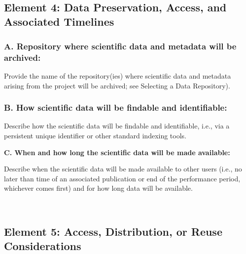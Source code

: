~

\subsection*{Element 4: Data Preservation, Access, and Associated Timelines}

\subsubsection*{A. Repository where scientific data and metadata will be archived:} 

Provide the name of the repository(ies) where scientific data and metadata arising from the project will be archived; see Selecting a Data Repository).

\subsubsection*{B. How scientific data will be findable and identifiable: }

Describe how the scientific data will be findable and identifiable, i.e., via a persistent unique identifier or other standard indexing tools.

\textbf{C. When and how long the scientific data will be made available: }
 
Describe when the scientific data will be made available to other users (i.e., no later than time of an associated publication or end of the performance period, whichever comes first) and for how long data will be available.

~

\subsection*{Element 5: Access, Distribution, or Reuse Considerations}

